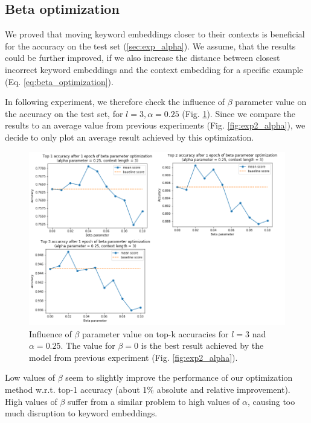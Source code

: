 \documentclass{llncs}
\begin{document}
\subsection{Beta optimization}
\label{sec:exp_beta}
We proved that moving keyword embeddings closer to their contexts is beneficial for the accuracy on the test set (\ref{sec:exp_alpha}).
We assume, that the results could be further improved, if we also increase the distance between closest incorrect keyword embeddings and the context embedding for a specific example (Eq. \ref{eq:beta_optimization}).

In following experiment, we therefore check the influence of \(\beta\) parameter value on the accuracy on the test set, for \(l=3, \alpha=0.25\) (Fig. \ref{fig:exp3_beta}).
Since we compare the results to an average value from previous experiments (Fig. \ref{fig:exp2_alpha}), we decide to only plot an average result achieved by this optimization.

\begin{figure}
    \centering
    \caption{Influence of \(\beta\) parameter value on top-k accuracies for \(l=3\) nad \(\alpha=0.25\). The value for \(\beta=0\) is the best result achieved by the model from previous experiment (Fig. \ref{fig:exp2_alpha}).}
    \label{fig:exp3_beta}
    \includegraphics[scale=0.65]{res/exp3_beta_top_acc.png}
\end{figure}

Low values of \(\beta\) seem to slightly improve the performance of our optimization method w.r.t. top-1 accuracy (about 1\% absolute and relative improvement).
High values of \(\beta\) suffer from a similar problem to high values of \(\alpha\), causing too much disruption to keyword embeddings.
\end{document}
